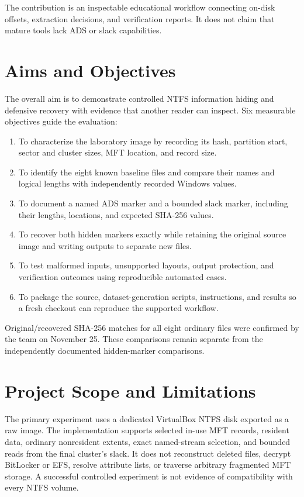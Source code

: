 The contribution is an inspectable educational workflow connecting on-disk
offsets, extraction decisions, and verification reports. It does not claim
that mature tools lack ADS or slack capabilities.

\section{Aims and Objectives}
The overall aim is to demonstrate controlled NTFS information hiding and
defensive recovery with evidence that another reader can inspect. Six
measurable objectives guide the evaluation:
\begin{enumerate}
\item To characterize the laboratory image by recording its hash, partition
start, sector and cluster sizes, MFT location, and record size.
\item To identify the eight known baseline files and compare their names and
logical lengths with independently recorded Windows values.
\item To document a named ADS marker and a bounded slack marker, including
their lengths, locations, and expected SHA-256 values.
\item To recover both hidden markers exactly while retaining the original
source image and writing outputs to separate new files.
\item To test malformed inputs, unsupported layouts, output protection, and
verification outcomes using reproducible automated cases.
\item To package the source, dataset-generation scripts, instructions, and
results so a fresh checkout can reproduce the supported workflow.
\end{enumerate}

Original/recovered SHA-256 matches for all eight ordinary files were
confirmed by the team on November 25. These comparisons remain separate
from the independently documented hidden-marker comparisons.

\section{Project Scope and Limitations}
The primary experiment uses a dedicated VirtualBox NTFS disk exported as a
raw image. The implementation supports selected in-use MFT records,
resident data, ordinary nonresident extents, exact named-stream selection,
and bounded reads from the final cluster's slack. It does not reconstruct
deleted files, decrypt BitLocker or EFS, resolve attribute lists, or traverse
arbitrary fragmented MFT storage. A successful controlled experiment is not
evidence of compatibility with every NTFS volume.

